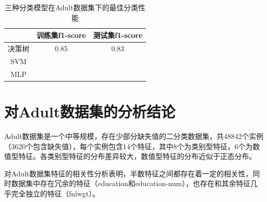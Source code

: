 \documentclass[12pt,a4paper]{article}
\theoremstyle{definition}
\begin{document}
\begin{table}[H]
	\renewcommand\arraystretch{1.35}
	\caption{三种分类模型在Adult数据集下的最佳分类性能}
	\label{tab:final_compare}
	\centering
	
	\begin{tabular}{c|c|c}
		\centering
		 & 训练集f1-score & 测试集f1-score \\
		\hline
		\hline
		
		决策树 & 0.85 & 0.83 \\
		SVM & & \\
		MLP & & \\	

	\end{tabular}
\end{table}


\section{对Adult数据集的分析结论}

Adult数据集是一个中等规模，存在少部分缺失值的二分类数据集，共48842个实例（3620个包含缺失值），每个实例包含14个特征，其中8个为类别型特征，6个为数值型特征。各类别型特征的分布差异较大，数值型特征的分布近似于正态分布。

\vspace{0.01\linewidth}
对Adult数据集特征的相关性分析表明，半数特征之间都存在着一定的相关性，同时数据集中存在冗余的特征（education和education-num），也存在和其余特征几乎完全独立的特征（fnlwgt）。
\end{document}
